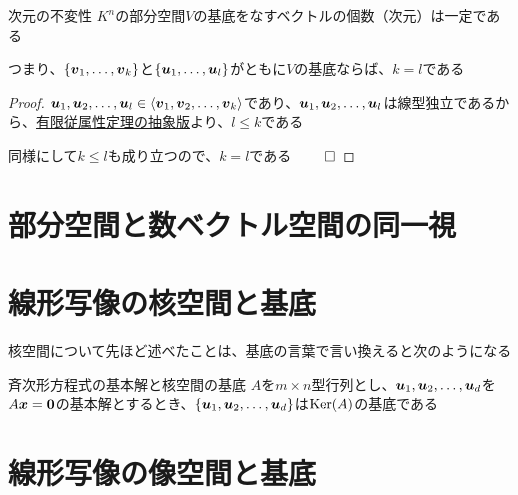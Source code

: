 \documentclass[../../../topic_linear-algebra]{subfiles}
\begin{document}
\begin{theorem}{次元の不変性}
  $K^n$の部分空間$V$の基底をなすベクトルの個数（次元）は一定である

  つまり、$\{ \vb*{v}_1, \dots, \vb*{v}_k \}$と$\{ \vb*{u}_1, \dots, \vb*{u}_l \}$がともに$V$の基底ならば、$k = l$である
\end{theorem}

\begin{proof}
  $\vb*{u}_1, \vb*{u}_2, \dots, \vb*{u}_l \in \langle \vb*{v}_1, \vb*{v}_2, \dots, \vb*{v}_k \rangle$であり、$\vb*{u}_1, \vb*{u}_2, \dots, \vb*{u}_l$は線型独立であるから、\hyperref[thm:abstract-finite-dependency]{有限従属性定理の抽象版}より、$l \leq k$である

  同様にして$k \leq l$も成り立つので、$k = l$である $\qed$
\end{proof}

\sectionline
\section{部分空間と数ベクトル空間の同一視}


\sectionline
\section{線形写像の核空間と基底}

核空間について先ほど述べたことは、基底の言葉で言い換えると次のようになる

\begin{theorem}{斉次形方程式の基本解と核空間の基底}
  $A$を$m \times n$型行列とし、$\vb*{u}_1, \vb*{u}_2, \dots, \vb*{u}_d$を$A\vb*{x} = \vb*{0}$の基本解とするとき、$\{ \vb*{u}_1, \vb*{u}_2, \dots, \vb*{u}_d \}$は$\operatorname{Ker}(A)$の基底である
\end{theorem}

\sectionline
\section{線形写像の像空間と基底}

\end{document}
